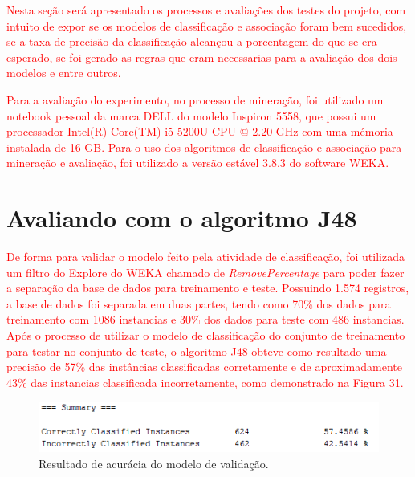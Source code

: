 \label{chapter:Avaliacao}

\par
\textcolor{red}{Nesta seção será apresentado os processos e avaliações dos testes do projeto, com intuito de expor se os modelos de classificação e associação foram bem sucedidos, se a taxa de precisão da classificação alcançou a porcentagem do que se era esperado, se foi gerado as regras que eram necessarias para a avaliação dos dois modelos e entre outros.}

\par
\textcolor{red}{Para a avaliação do experimento, no processo de mineração, foi utilizado um notebook pessoal da marca DELL do modelo Inspiron 5558, que possui um processador Intel(R) Core(TM) i5-5200U CPU @ 2.20 GHz com uma mémoria instalada de 16 GB. Para o uso dos algoritmos de classificação e associação para mineração e avaliação, foi utilizado a versão estável 3.8.3 do software WEKA.}

\section{Avaliando com o algoritmo J48}

\par
\textcolor{red}{De forma para validar o modelo feito pela atividade de classificação, foi utilizada um filtro do Explore do WEKA chamado de \textit{RemovePercentage} para poder fazer a separação da base de dados para treinamento e teste. Possuindo 1.574 registros, a base de dados foi separada em duas partes, tendo como 70\% dos dados para treinamento com 1086 instancias e 30\% dos dados para teste com 486 instancias. Após o processo de utilizar o modelo de classificação do conjunto de treinamento para testar no conjunto de teste, o algoritmo J48 obteve como resultado uma precisão de 57\% das instâncias classificadas corretamente e de aproximadamente 43\% das instancias classificada incorretamente, como demonstrado na Figura 31.}

\par
\begin{figure}[!htp]
	\begin{center}
    \caption{\label{fig:waveform_fig} Resultado de acurácia do modelo de validação.}
	\includegraphics[scale=0.99]{Figuras/Modelo_de_validacao.png}
	\end{center}
\end{figure}

